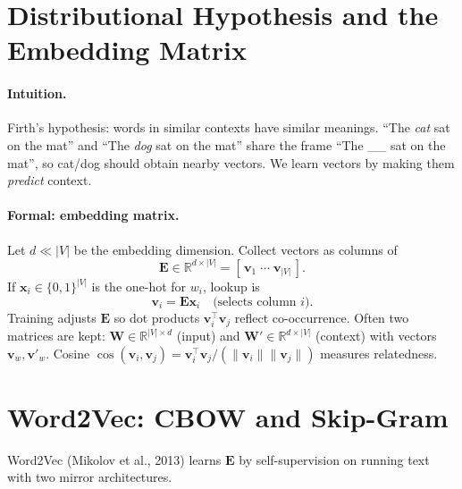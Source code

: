 \section{Distributional Hypothesis and the Embedding Matrix}
\label{sec:distributional}
\paragraph{Intuition.} Firth's hypothesis: words in similar contexts have
similar meanings. ``The \emph{cat} sat on the mat'' and ``The \emph{dog} sat
on the mat'' share the frame ``The \_\_ sat on the mat'', so cat/dog should
obtain nearby vectors. We learn vectors by making them \emph{predict} context.
\paragraph{Formal: embedding matrix.} Let $d\ll|V|$ be the embedding dimension.
Collect vectors as columns of
\begin{equation}
  \mathbf{E}\in\mathbb{R}^{d\times |V|}=[\,\mathbf{v}_{1}\;\cdots\;\mathbf{v}_{|V|}\,].
\end{equation}
If $\mathbf{x}_{i}\in\{0,1\}^{|V|}$ is the one-hot for $w_{i}$, lookup is
\begin{equation}
  \mathbf{v}_{i}=\mathbf{E}\mathbf{x}_{i}\quad\text{(selects column $i$).}
\end{equation}
Training adjusts $\mathbf{E}$ so dot products $\mathbf{v}_{i}^{\top}
\mathbf{v}_{j}$ reflect co-occurrence. Often two matrices are kept:
$\mathbf{W}\in\mathbb{R}^{|V|\times d}$ (input) and
$\mathbf{W}'\in\mathbb{R}^{d\times |V|}$ (context) with vectors
$\mathbf{v}_{w},\mathbf{v}'_{w}$. Cosine
$\cos(\mathbf{v}_{i},\mathbf{v}_{j})=\mathbf{v}_{i}^{\top}\mathbf{v}_{j}/
(\|\mathbf{v}_{i}\|\|\mathbf{v}_{j}\|)$ measures relatedness.
\section{Word2Vec: CBOW and Skip-Gram}
\label{sec:word2vec}
Word2Vec (Mikolov et al., 2013) learns $\mathbf{E}$ by self-supervision on
running text with two mirror architectures.
